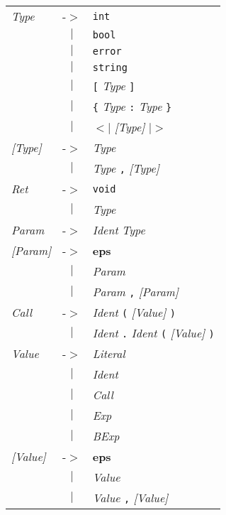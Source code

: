 \documentclass{article}
\begin{document}
\begin{tabular}{lll}
\textit{Type} & -$>$ & \texttt{int} \\
 & \multicolumn{1}{c}{\textbf{$|$}} & \texttt{bool} \\
 & \multicolumn{1}{c}{\textbf{$|$}} & \texttt{error} \\
 & \multicolumn{1}{c}{\textbf{$|$}} & \texttt{string} \\
 & \multicolumn{1}{c}{\textbf{$|$}} & \texttt{[} \textit{Type} \texttt{]} \\
 & \multicolumn{1}{c}{\textbf{$|$}} & \texttt{\{} \textit{Type} \texttt{:} \textit{Type} \texttt{\}} \\
 & \multicolumn{1}{c}{\textbf{$|$}} & \texttt{$<$$|$} \textit{[Type]} \texttt{$|$$>$} \\
\textit{[Type]} & -$>$ & \textit{Type} \\
 & \multicolumn{1}{c}{\textbf{$|$}} & \textit{Type} \texttt{,} \textit{[Type]} \\
\textit{Ret} & -$>$ & \texttt{void} \\
 & \multicolumn{1}{c}{\textbf{$|$}} & \textit{Type} \\
\textit{Param} & -$>$ & \textit{Ident} \textit{Type} \\
\textit{[Param]} & -$>$ & \textbf{eps} \\
 & \multicolumn{1}{c}{\textbf{$|$}} & \textit{Param} \\
 & \multicolumn{1}{c}{\textbf{$|$}} & \textit{Param} \texttt{,} \textit{[Param]} \\
\textit{Call} & -$>$ & \textit{Ident} \texttt{(} \textit{[Value]} \texttt{)} \\
 & \multicolumn{1}{c}{\textbf{$|$}} & \textit{Ident} \texttt{.} \textit{Ident} \texttt{(} \textit{[Value]} \texttt{)} \\
\textit{Value} & -$>$ & \textit{Literal} \\
 & \multicolumn{1}{c}{\textbf{$|$}} & \textit{Ident} \\
 & \multicolumn{1}{c}{\textbf{$|$}} & \textit{Call} \\
 & \multicolumn{1}{c}{\textbf{$|$}} & \textit{Exp} \\
 & \multicolumn{1}{c}{\textbf{$|$}} & \textit{BExp} \\
\textit{[Value]} & -$>$ & \textbf{eps} \\
 & \multicolumn{1}{c}{\textbf{$|$}} & \textit{Value} \\
 & \multicolumn{1}{c}{\textbf{$|$}} & \textit{Value} \texttt{,} \textit{[Value]} \\

\end{tabular}
\end{document}
